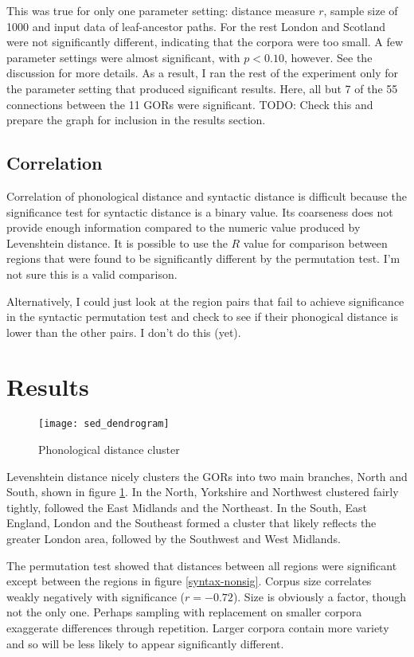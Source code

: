 \documentclass[11pt]{article}
\begin{document}
This was true for only one parameter setting: distance measure $r$,
sample size of 1000 and input data of leaf-ancestor paths. For the
rest London and Scotland were not significantly different, indicating
that the corpora were too small. A few parameter settings were almost
significant, with $p < 0.10$, however. See the discussion for more details.
As a result, I ran the rest of the experiment only for the parameter
setting that produced significant results. Here, all but 7 of the 55
connections between the 11 GORs were significant.
TODO: Check this and prepare the graph for inclusion in the results
section.

\subsection{Correlation}
Correlation of phonological distance and syntactic distance is
difficult because the significance test for syntactic distance is a
binary value. Its coarseness does not provide enough information
compared to the numeric value produced by Levenshtein distance.
It is possible to use the $R$ value for comparison between regions
that were found to be significantly different by the permutation
test. I'm not sure this is a valid comparison.

Alternatively, I could just look at the region pairs that fail to
achieve significance in the syntactic permutation test and check to
see if their phonogical distance is lower than the other pairs. I
don't do this (yet).

\section{Results}

\begin{figure}
  \texttt{[image: sed\_dendrogram]}
\caption{Phonological distance cluster}
\label{phonology-dendrogram}
\end{figure}

Levenshtein distance nicely clusters the GORs into two main branches,
North and South, shown in figure \ref{phonology-dendrogram}. In the
North, Yorkshire and Northwest clustered fairly tightly, followed the
East Midlands and the Northeast. In the South, East England, London
and the Southeast formed a cluster that likely reflects the greater
London area, followed by the Southwest and West Midlands.

The permutation test showed that distances between all regions were
significant except between the regions in figure
\ref{syntax-nonsig}. Corpus size correlates weakly negatively with
significance ($r = -0.72$). Size is obviously a factor, though not the
only one. Perhaps sampling with replacement on smaller corpora
exaggerate differences through repetition. Larger corpora contain more
variety and so will be less likely to appear significantly different.
\end{document}
